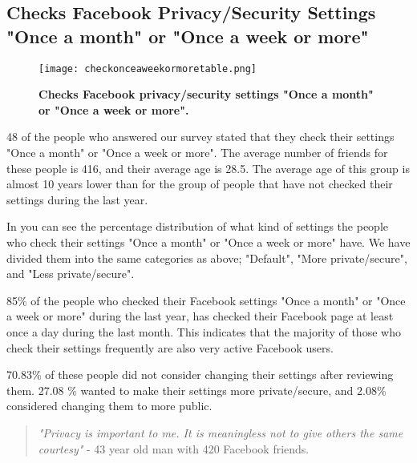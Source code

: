 \subsection{Checks Facebook Privacy/Security Settings "Once a month" or "Once a week or more"}

\begin{figure}[h!]
\centering
\texttt{[image: checkonceaweekormoretable.png]}
\caption[Checks Facebook privacy/security settings "Once a month" or "Once a week or more"]{\textbf{Checks Facebook privacy/security settings "Once a month" or "Once a week or more".}} 
\label{fig:onceaweekormore}
\end{figure}

48 of the people who answered our survey stated that they check their settings "Once a month" or "Once a week or more". The average number of friends for these people is 416, and their average age is 28.5. The average age of this group is almost 10 years lower than for the group of people that have not checked their settings during the last year.

In  you can see the percentage distribution of what kind of settings the people who check their settings "Once a month" or "Once a week or more" have. We have divided them into the same categories as above; "Default", "More private/secure", and "Less private/secure".  

85\% of the people who checked their Facebook settings "Once a month" or "Once a week or more" during the last year, has checked their Facebook page at least once a day during the last month. This indicates that the majority of those who check their settings frequently are also very active Facebook users. 

70.83\% of these people did not consider changing their settings after reviewing them. 27.08 \% wanted to make their settings more private/secure, and 2.08\% considered changing them to more public. 



\begin{quote}
\textit{"Privacy is important to me. It is meaningless not to give others the same courtesy"} - 43 year old man with 420 Facebook friends. 
\end{quote}


